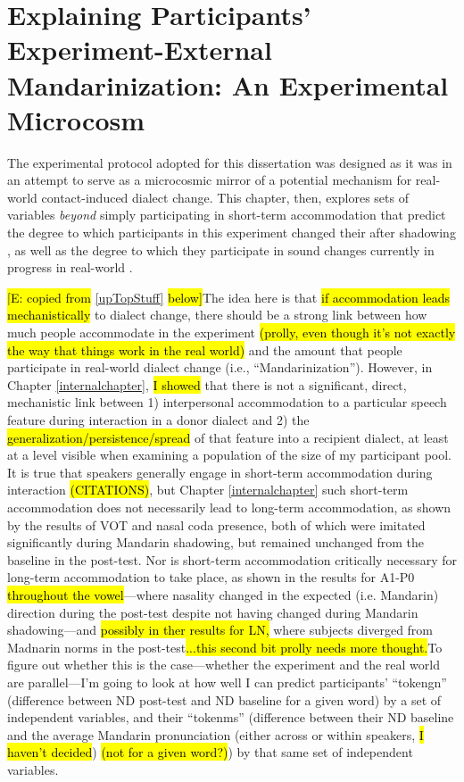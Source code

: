 \chapter{Explaining Participants' Experiment-External Mandarinization: An Experimental Microcosm}
\label{microcosmchapter}
The experimental protocol adopted for this dissertation was designed as it was in an attempt to serve as a microcosmic mirror of a potential mechanism for real-world contact-induced dialect change. This chapter, then, explores sets of variables \emph{beyond} simply participating in short-term accommodation that predict the degree to which participants in this experiment changed their \ND{} after shadowing \annie, as well as the degree to which they participate in sound changes currently in progress in real-world \ND{}.

\hl{[E: copied from }\ref{upTopStuff}\hl{ below]}The idea here is that \hl{if accommodation leads mechanistically} to dialect change, there should be a strong link between how much people accommodate in the experiment \hl{(prolly, even though it's not exactly the way that things work in the real world)} and the amount that people participate in real-world dialect change (i.e., ``Mandarinization''). However, in Chapter \ref{internalchapter}, \hl{I showed} that there is not a significant, direct, mechanistic link between 1) interpersonal accommodation to a particular speech feature during interaction in a donor dialect and 2) the \hl{generalization/persistence/spread} of that feature into a recipient dialect, at least at a level visible when examining a population of the size of my participant pool. It is true that speakers generally engage in short-term accommodation during interaction \hl{(CITATIONS)}, but Chapter \ref{internalchapter} such short-term accommodation does not necessarily lead to long-term accommodation, as shown by the results of VOT and nasal coda presence, both of which were imitated significantly during Mandarin shadowing, but remained unchanged from the \ND{} baseline in the post-test. Nor is short-term accommodation critically necessary for long-term accommodation to take place, as shown in the results for A1-P0 \hl{throughout the vowel}---where nasality changed in the expected (i.e. Mandarin) direction during the \ND{} post-test despite not having changed during Mandarin shadowing---and \hl{possibly in ther results for LN,} where subjects diverged from Madnarin norms in the \ND{} post-test\hl{...this second bit prolly needs more thought.}To figure out whether this is the case---whether the experiment and the real world are parallel---I'm going to look at how well I can predict participants' ``tokengn'' (difference between ND post-test and ND baseline for a given word) by a set of independent variables, and their ``tokenms'' (difference between their ND baseline and the average Mandarin pronunciation (either across or within speakers, \hl{I haven't decided}) \hl{(not for a given word?)}) by that same set of independent variables.

